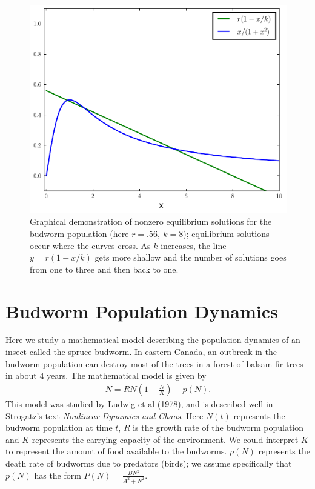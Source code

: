 \begin{figure}
\centering
\includegraphics[width=\textwidth]{BudwormEquilibria.pdf}
\caption{Graphical demonstration of nonzero equilibrium solutions for the budworm population (here $r = .56,\ k=8$); equilibrium solutions occur where the curves cross.
As $k$ increases, the line $y=r(1- x/k)$ gets more shallow and the number of solutions goes from one to three and then back to one. }
\label{equilibria:budworm}
\end{figure}

\section*{Budworm Population Dynamics}
Here we study a mathematical model describing the population dynamics of an insect called the spruce budworm.
In eastern Canada, an outbreak in the budworm population can destroy most of the trees in a forest of balsam fir trees in about 4 years.
The mathematical model is given by
\begin{align}
\dot{N} = RN\left(1 - \frac{N}{K}\right) - p(N). \label{budworm1}
\end{align}
This model was studied by Ludwig et al (1978), and is described well in Strogatz's text \emph{Nonlinear Dynamics and Chaos}.
Here $N(t)$ represents the budworm population at time $t$, $R$ is the growth rate of the budworm population and $K$ represents the carrying capacity of the environment.
We could interpret $K$ to represent the amount of food available to the budworms.
$p(N)$ represents the death rate of budworms due to predators (birds); we assume specifically that $p(N)$ has the form $P(N) = \frac{BN^2}{A^2 + N^2}$.

